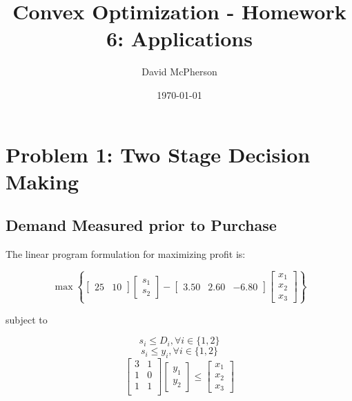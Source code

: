 \documentclass[a4paper]{article}
\title{Convex Optimization - Homework 6: Applications}
\author{David McPherson}
\date{\today}
\begin{document}
\maketitle

\section{Problem 1: Two Stage Decision Making}
\subsection{Demand Measured prior to Purchase}

The linear program formulation for maximizing profit is:

\begin{equation}
\max \left \{ [\begin{matrix}25 & 10\end{matrix}]\left [\begin{matrix}s_1 \\ s_2 \end{matrix} \right ]
-[\begin{matrix}3.50 & 2.60 & -6.80\end{matrix}] \left [\begin{matrix}x_1 \\ x_2 \\ x_3 \end{matrix} \right ]
\right \}
\end{equation}

subject to

\begin{equation}
s_i \leq D_i , \forall i \in \{1,2\}
\end{equation}
\begin{equation}
s_i \leq y_i , \forall i \in \{1,2\}
\end{equation}
\begin{equation}
\left[
\begin{matrix}
3 & 1 \\
1 & 0 \\
1 & 1 \\
\end{matrix}
\right]
\left[\begin{matrix}y_1 \\ y_2\end{matrix}\right]
\leq
\left[\begin{matrix}x_1 \\ x_2 \\ x_3 \end{matrix}\right]
\end{equation}
\end{document}
